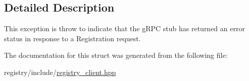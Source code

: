 \subsection{Detailed Description}
This exception is throw to indicate that the g\+R\+PC stub has returned an error status in response to a Registration request. 

The documentation for this struct was generated from the following file\+:\begin{DoxyCompactItemize}
\item 
registry/include/\hyperlink{registry__client_8hpp}{registry\+\_\+client.\+hpp}\end{DoxyCompactItemize}

